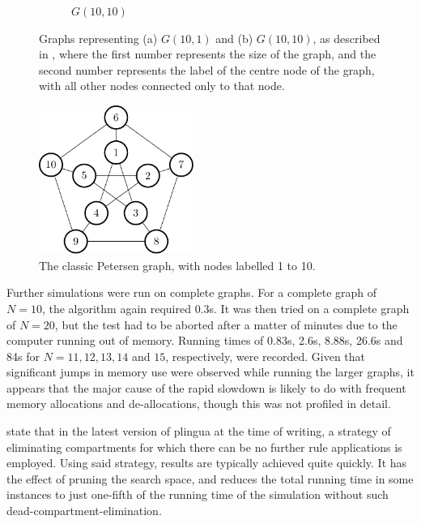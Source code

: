 \begin{figure}
\begin{subfigure}[b]{0.35\textwidth}
        \caption{\label{fig:gcol:g-10-10}\(G(10,10)\)}
    \end{subfigure}
    \caption[Graphs representing \(G(10,1)\) and \(G(10,10)\)]{\label{fig:gcol:gs}Graphs representing (a) \(G(10,1)\) and (b) \(G(10,10)\), as described in \cite{Gheorghe2013}, where the first number represents the size of the graph, and the second number represents the label of the centre node of the graph, with all other nodes connected only to that node.}
\end{figure}

\begin{figure}
    \centering
    \includegraphics[width=0.45\textwidth]{chapters/gcol/figs/petersen-figure0.pdf}
    \caption[The Petersen Graph]{\label{fig:gcol:petersen}The classic Petersen graph, with nodes labelled 1 to 10.}
\end{figure}

Further simulations were run on complete graphs.  For a complete graph of \(N = 10\), the algorithm again required 0.3s.  It was then tried on a complete graph of \(N = 20\), but the test had to be aborted after a matter of minutes due to the computer running out of memory.  Running times of 0.83s, 2.6s, 8.88s, 26.6s and 84s for \(N = 11, 12, 13, 14\) and \(15\), respectively, were recorded.  Given that significant jumps in memory use were observed while running the larger graphs, it appears that the major cause of the rapid slowdown is likely to do with frequent \adhoc{} memory allocations and de-allocations, though this was not profiled in detail.

\citeauthor{Gheorghe2013} state \cite[p.~828]{Gheorghe2013} that in the latest version of \gls{plingua} at the time of writing, a strategy of eliminating compartments for which there can be no further rule applications is employed.  Using said strategy, results are typically achieved quite quickly.  It has the effect of pruning the search space, and reduces the total running time in some instances to just one-fifth of the running time of the simulation without such dead-compartment-elimination.


